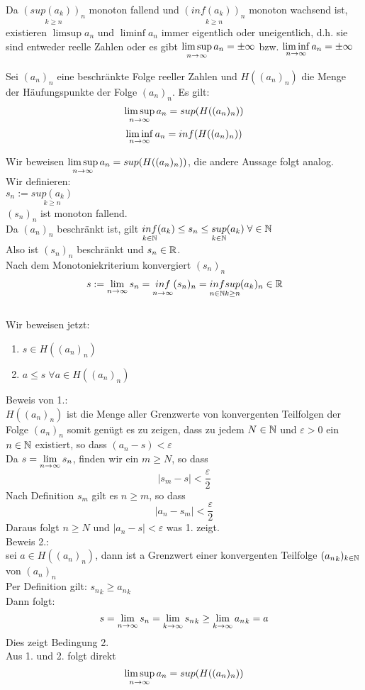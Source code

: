 \documentclass[../ana1u.tex]{subfiles}
\begin{document}
\begin{bem}
    Da \(\underset{k \geq n}{(sup(a_k))_n}\) monoton fallend und \(\underset{k \geq n}{(inf(a_k))_n}\) monoton wachsend ist, existieren \(\limsup a_n \) und \(\liminf a_n\) immer eigentlich oder uneigentlich, d.h. sie sind entweder reelle Zahlen oder es gibt \(\limsup\limits_{n\rightarrow\infty} a_n = \pm \infty \) bzw. \(\liminf\limits_{n\rightarrow\infty} a_n = \pm \infty \) 
\end{bem}
\begin{lem}
    Sei \((a_n)_n\) eine beschränkte Folge reeller Zahlen und \(H((a_n)_n)\) die Menge der Häufungspunkte der Folge \((a_n)_n\). Es gilt:\\
    \[\limsup\limits_{n\rightarrow\infty} a_n = sup(H((a_n)_n))\]
    \[\liminf\limits_{n\rightarrow\infty} a_n = inf(H((a_n)_n))\]
\end{lem}
\begin{bew}
    Wir beweisen \(\limsup\limits_{n\rightarrow\infty} a_n = sup(H((a_n)_n))\), die andere Aussage folgt analog.\\
    Wir definieren:\\
    \(s_n := \underset{k \geq n}{sup(a_k)}\)\\
    \((s_n)_n\) ist monoton fallend.\\
    Da \((a_n)_n\) beschränkt ist, gilt \(\underset{k \in \mathbb{N}}{inf}(a_k) \leq s_n \leq \underset{k \in \mathbb{N}}{sup}(a_k) \; \forall \in \mathbb{N}\)\\
    Also ist \((s_n)_n\) beschränkt und \(s_n \in \mathbb{R}\).\\
    Nach dem Monotoniekriterium konvergiert \((s_n)_n\)\\
    \[s := \lim\limits_{n\rightarrow\infty} s_n = \underset{n \rightarrow \infty}{inf}(s_n)_n = \underset{n \in \mathbb{N}}{inf}\underset{k \geq n}{sup}(a_k)_n \in \mathbb{R}\]\\
    Wir beweisen jetzt:
    \begin{enumerate}
        \item \(s \in H((a_n)_n)\)
        \item \(a \leq s \; \forall a \in H((a_n)_n)\)
    \end{enumerate}
    Beweis von 1.:\\
    \(H((a_n)_n)\) ist die Menge aller Grenzwerte von konvergenten Teilfolgen der Folge \((a_n)_n\) somit genügt es zu zeigen, dass zu jedem \(N \in \mathbb{N}\) und \(\varepsilon > 0\) ein \(n \in \mathbb{N}\) existiert, so dass \((a_n - s) < \varepsilon\)\\
    Da \(s = \lim\limits_{n\rightarrow\infty} s_n\), finden wir ein \(m \geq N\), so dass 
    \[|s_m - s| < \frac{\varepsilon}{2}\]
    Nach Definition \(s_m\) gilt es \(n \geq m\), so dass
    \[|a_n - s_m| < \frac{\varepsilon}{2}\]
    Daraus folgt \(n \geq N\) und \(|a_n - s| < \varepsilon\) was 1. zeigt.\\
    Beweis 2.:\\
    sei \(a \in H((a_n)_n)\), dann ist a Grenzwert einer konvergenten Teilfolge \(({a_n}_k)_{k \in \mathbb{N}}\) von \((a_n)_n\)\\
    Per Definition gilt: \({s_n}_k \geq {a_n}_k\)\\
    Dann folgt:
    \[s = \lim\limits_{n\rightarrow\infty} s_n = \lim\limits_{k\rightarrow\infty} {s_n}_k \geq \lim\limits_{k\rightarrow\infty} {a_n}_k = a\]
    Dies zeigt Bedingung 2.\\
    Aus 1. und 2. folgt direkt
    \[\limsup\limits_{n\rightarrow\infty} a_n = sup(H((a_n)_n))\]
\end{bew}
\end{document}
